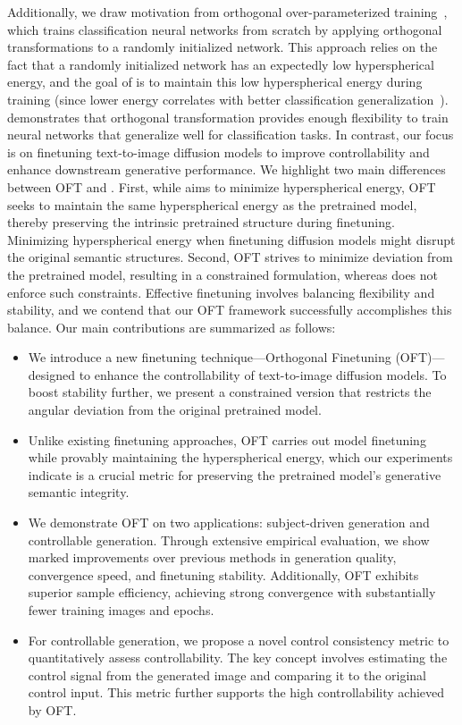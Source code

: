 Additionally, we draw motivation from orthogonal over-parameterized training~\cite{liu2021orthogonal}, which trains classification neural networks from scratch by applying orthogonal transformations to a randomly initialized network. This approach relies on the fact that a randomly initialized network has an expectedly low hyperspherical energy, and the goal of \cite{liu2021orthogonal} is to maintain this low hyperspherical energy during training (since lower energy correlates with better classification generalization~\cite{liu2018learning,lin2020regularizing}). \cite{liu2021orthogonal} demonstrates that orthogonal transformation provides enough flexibility to train neural networks that generalize well for classification tasks. In contrast, our focus is on finetuning text-to-image diffusion models to improve controllability and enhance downstream generative performance. We highlight two main differences between OFT and \cite{liu2021orthogonal}. First, while \cite{liu2021orthogonal} aims to minimize hyperspherical energy, OFT seeks to maintain the same hyperspherical energy as the pretrained model, thereby preserving the intrinsic pretrained structure during finetuning. Minimizing hyperspherical energy when finetuning diffusion models might disrupt the original semantic structures. Second, OFT strives to minimize deviation from the pretrained model, resulting in a constrained formulation, whereas \cite{liu2021orthogonal} does not enforce such constraints. Effective finetuning involves balancing flexibility and stability, and we contend that our OFT framework successfully accomplishes this balance. Our main contributions are summarized as follows:

\begin{itemize}[leftmargin=*,nosep]

    \item We introduce a new finetuning technique—Orthogonal Finetuning (OFT)—designed to enhance the controllability of text-to-image diffusion models. To boost stability further, we present a constrained version that restricts the angular deviation from the original pretrained model.
    \item Unlike existing finetuning approaches, OFT carries out model finetuning while provably maintaining the hyperspherical energy, which our experiments indicate is a crucial metric for preserving the pretrained model’s generative semantic integrity.
    \item We demonstrate OFT on two applications: subject-driven generation and controllable generation. Through extensive empirical evaluation, we show marked improvements over previous methods in generation quality, convergence speed, and finetuning stability. Additionally, OFT exhibits superior sample efficiency, achieving strong convergence with substantially fewer training images and epochs.
    \item For controllable generation, we propose a novel control consistency metric to quantitatively assess controllability. The key concept involves estimating the control signal from the generated image and comparing it to the original control input. This metric further supports the high controllability achieved by OFT.
\end{itemize}

